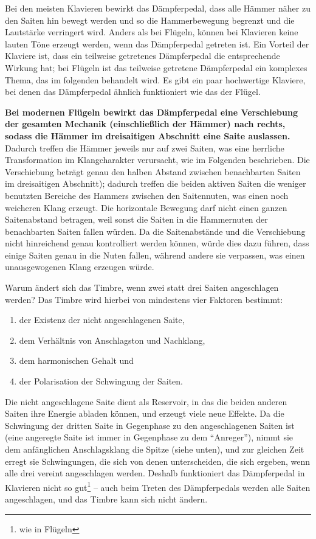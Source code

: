 Bei den meisten Klavieren bewirkt das Dämpferpedal, dass alle Hämmer näher zu den Saiten hin bewegt werden und so die Hammerbewegung begrenzt und die Lautstärke verringert wird.
Anders als bei Flügeln, können bei Klavieren keine lauten Töne erzeugt werden, wenn das Dämpferpedal getreten ist.
Ein Vorteil der Klaviere ist, dass ein teilweise getretenes Dämpferpedal die entsprechende Wirkung hat;
bei Flügeln ist das teilweise getretene Dämpferpedal ein komplexes Thema, das im folgenden behandelt wird.
Es gibt ein paar hochwertige Klaviere, bei denen das Dämpferpedal ähnlich funktioniert wie das der Flügel.

\textbf{Bei modernen Flügeln bewirkt das Dämpferpedal eine Verschiebung der gesamten Mechanik (einschließlich der Hämmer) nach rechts, sodass die Hämmer im dreisaitigen Abschnitt eine Saite auslassen.}
Dadurch treffen die Hämmer jeweils nur auf zwei Saiten, was eine herrliche Transformation im Klangcharakter verursacht, wie im Folgenden beschrieben.
Die Verschiebung beträgt genau den halben Abstand zwischen benachbarten Saiten im dreisaitigen Abschnitt);
dadurch treffen die beiden aktiven Saiten die weniger benutzten Bereiche des Hammers zwischen den Saitennuten, was einen noch weicheren Klang erzeugt.
Die horizontale Bewegung darf nicht einen ganzen Saitenabstand betragen, weil sonst die Saiten in die Hammernuten der benachbarten Saiten fallen würden.
Da die Saitenabstände und die Verschiebung nicht hinreichend genau kontrolliert werden können, würde dies dazu führen, dass einige Saiten genau in die Nuten fallen, während andere sie verpassen, was einen unausgewogenen Klang erzeugen würde.

Warum ändert sich das Timbre, wenn zwei statt drei Saiten angeschlagen werden?
Das Timbre wird hierbei von mindestens vier Faktoren bestimmt:

\begin{enumerate} 
 \item der Existenz der nicht angeschlagenen Saite,
 \item dem Verhältnis von Anschlagston und Nachklang,
 \item dem harmonischen Gehalt und
 \item der Polarisation der Schwingung der Saiten.
\end{enumerate}

Die nicht angeschlagene Saite dient als Reservoir, in das die beiden anderen Saiten ihre Energie abladen können, und erzeugt viele neue Effekte.
Da die Schwingung der dritten Saite in Gegenphase zu den angeschlagenen Saiten ist (eine angeregte Saite ist immer in Gegenphase zu dem \enquote{Anreger}), nimmt sie dem anfänglichen Anschlagsklang die Spitze (siehe unten), und zur gleichen Zeit erregt sie Schwingungen, die sich von denen unterscheiden, die sich ergeben, wenn alle drei vereint angeschlagen werden.
Deshalb funktioniert das Dämpferpedal in Klavieren nicht so gut\footnote{wie in Flügeln} -- auch beim Treten des Dämpferpedals werden alle Saiten angeschlagen, und das Timbre kann sich nicht ändern.


